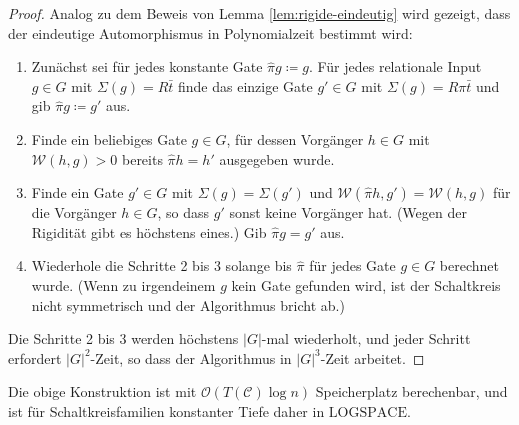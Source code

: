 \begin{proof}
Analog zu dem Beweis von Lemma \ref{lem:rigide-eindeutig} wird gezeigt,
dass der eindeutige Automorphismus in Polynomialzeit bestimmt wird:

\begin{enumerate}
\item Zunächst sei für jedes konstante Gate $\hat{\pi}g\coloneqq g$. Für
jedes relationale Input $g\in G$ mit $\Sigma\left(g\right)=R\bar{t}$
finde das einzige Gate $g'\in G$ mit $\Sigma\left(g\right)=R\pi\bar{t}$
und gib $\hat{\pi}g\coloneqq g'$ aus.
\item Finde ein beliebiges Gate $g\in G$, für dessen Vorgänger $h\in G$
mit $\mathcal{W}\left(h,g\right)>0$ bereits $\hat{\pi}h=h'$ ausgegeben
wurde.
\item Finde ein Gate $g'\in G$ mit $\Sigma\left(g\right)=\Sigma\left(g'\right)$
und $\mathcal{W}\left(\hat{\pi}h,g'\right)=\mathcal{W}\left(h,g\right)$
für die Vorgänger $h\in G$, so dass $g'$ sonst keine Vorgänger hat.
(Wegen der Rigidität gibt es höchstens eines.) Gib $\hat{\pi}g=g'$
aus.
\item Wiederhole die Schritte 2 bis 3 solange bis $\hat{\pi}$ für jedes
Gate $g\in G$ berechnet wurde. (Wenn zu irgendeinem $g$ kein Gate
gefunden wird, ist der Schaltkreis nicht symmetrisch und der Algorithmus
bricht ab.)
\end{enumerate}
Die Schritte 2 bis 3 werden höchstens $\left|G\right|$-mal wiederholt,
und jeder Schritt erfordert $\left|G\right|^{2}$-Zeit, so dass der
Algorithmus in $\left|G\right|^{3}$-Zeit arbeitet.
\end{proof}
\begin{prop}
Die obige Konstruktion ist mit $\mathcal{O}\left(T\left(\mathcal{C}\right)\log n\right)$
Speicherplatz berechenbar, und ist für Schaltkreisfamilien konstanter
Tiefe daher in $\mathrm{LOGSPACE}$.
\end{prop}
